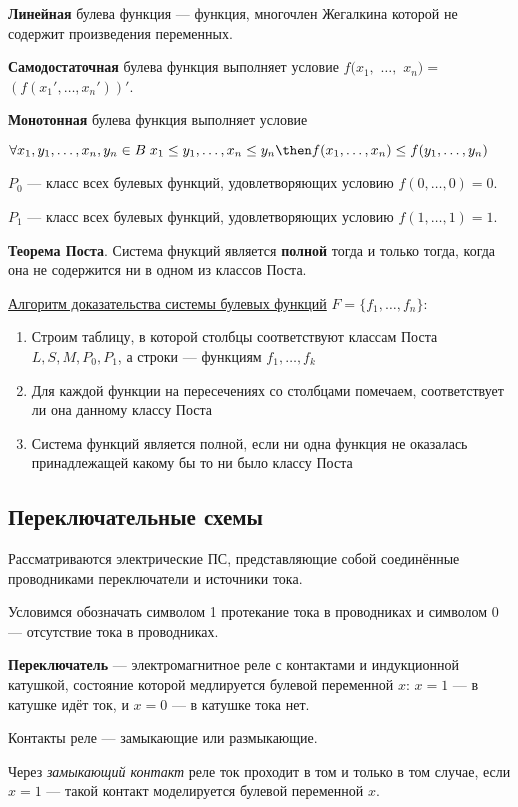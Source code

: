 \dftion \textbf{Линейная} булева функция --- функция, многочлен Жегалкина которой не содержит произведения переменных.

\dftion \textbf{Самодостаточная} булева функция выполняет условие $f(x_1,$ $\dots,$ $x_n) =$ $(f(x_1', \dots, x_n'))'$.

\dftion \textbf{Монотонная} булева функция выполняет условие

$\forall x_1, y_1, \dots, x_n, y_n \in B \; x_1 \leq y_1, \dots, x_n \leq y_n \then f(x_1, \dots, x_n) \leq f(y_1, \dots, y_n)$

\dftion $P_0$ --- класс всех булевых функций, удовлетворяющих условию $f(0,\dots,0)=0$.

\dftion $P_1$ --- класс всех булевых функций, удовлетворяющих условию $f(1,\dots,1)=1$.

\dftion \textbf{Теорема Поста}. Система фнукций является \textbf{полной} тогда и только тогда, когда она не содержится ни в одном из классов Поста.

\underline{Алгоритм доказательства системы булевых функций} $F = \{f_1, \dots, f_n\}$:
\begin{enumerate}
    \item Строим таблицу, в которой столбцы соответствуют классам Поста $L, S, M, P_0, P_1$, а строки --- функциям $f_1, \dots, f_k$
    \item Для каждой функции на пересечениях со столбцами помечаем, соответствует ли она данному классу Поста
    \item Система функций является полной, если ни одна функция не оказалась принадлежащей какому бы то ни было классу Поста
\end{enumerate}
\subsection{Переключательные схемы}
Рассматриваются электрические ПС, представляющие собой соединённые проводниками переключатели и источники тока.

Условимся обозначать символом 1 протекание тока в проводниках и символом 0 --- отсутствие тока в проводниках.

\dftion \textbf{Переключатель} --- электромагнитное реле с контактами и индукционной катушкой, состояние которой медлируется булевой переменной $x$: $x = 1$ --- в катушке идёт ток, и $x = 0$ --- в катушке тока нет.

Контакты реле --- замыкающие или размыкающие.

Через \textit{замыкающий контакт} реле ток проходит в том и только в том случае, если $x = 1$ --- такой контакт моделируется булевой переменной $x$.


